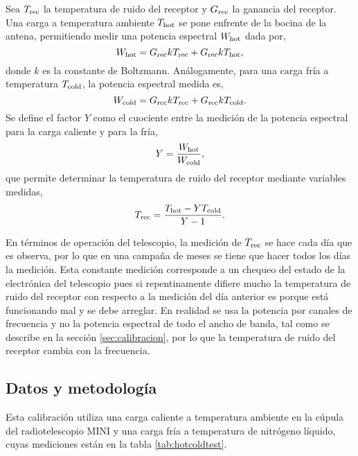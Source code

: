 Sea $T_\textnormal{rec}$ la temperatura de ruido del receptor y $G_\textnormal{rec}$ la ganancia del receptor. Una carga a temperatura ambiente $T_\textnormal{hot}$ se pone enfrente de la bocina de la antena, permitiendo medir una potencia espectral $W_\textnormal{hot}$ dada por,
\begin{equation}
W_\textnormal{hot}=G_\textnormal{rec}kT_\textnormal{rec}+G_\textnormal{rec}kT_\textnormal{hot}
,\end{equation}
donde $k$ es la constante de Boltzmann. Análogamente, para una carga fría a temperatura $T_\textnormal{cold}$, la potencia espectral medida es,
\begin{equation}
W_\textnormal{cold}=G_\textnormal{rec}kT_\textnormal{rec}+G_\textnormal{rec}kT_\textnormal{cold}
.\end{equation}
Se define el factor $Y$ como el cuociente entre la medición de la potencia espectral para la carga caliente y para la fría,
\begin{equation}
Y=\frac{W_\textnormal{hot}}{W_\textnormal{cold}}\label{eq:yfactor}
,\end{equation}
que permite determinar la temperatura de ruido del receptor mediante variables medidas,
\begin{equation}
T_\textnormal{rec}=\frac{T_\textnormal{hot}-YT_\textnormal{cold}}{Y-1}\label{eq:trec}
.\end{equation}

En términos de operación del telescopio, la medición de $T_\textnormal{rec}$ se hace cada día que es observa, por lo que en una campaña de meses se tiene que hacer todos los días la medición. Esta constante medición corresponde a un chequeo del estado de la electrónica del telescopio pues si repentinamente difiere mucho la temperatura de ruido del receptor con respecto a la medición del día anterior es porque está funcionando mal y se debe arreglar. En realidad se usa la potencia por canales de frecuencia y no la potencia espectral de todo el ancho de banda, tal como se describe en la sección \ref{sec:calibracion}, por lo que la temperatura de ruido del receptor cambia con la frecuencia.


\subsection{Datos y metodología}

Esta calibración utiliza una carga caliente a temperatura ambiente en la cúpula del radiotelescopio MINI y una carga fría a temperatura de nitrógeno líquido, cuyas mediciones están en la tabla \ref{tab:hotcoldtest}.

